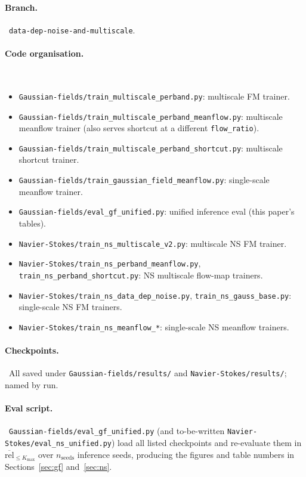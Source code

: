 \documentclass[11pt]{article}
\newcommand{\meanrel}{\overline{\text{rel}}}
\begin{document}
\paragraph{Branch.}\ \texttt{data-dep-noise-and-multiscale}.

\paragraph{Code organisation.}\
\begin{itemize}
\item \texttt{Gaussian-fields/train\_multiscale\_perband.py}: multiscale FM trainer.
\item \texttt{Gaussian-fields/train\_multiscale\_perband\_meanflow.py}: multiscale meanflow trainer (also serves shortcut at a different \texttt{flow\_ratio}).
\item \texttt{Gaussian-fields/train\_multiscale\_perband\_shortcut.py}: multiscale shortcut trainer.
\item \texttt{Gaussian-fields/train\_gaussian\_field\_meanflow.py}: single-scale meanflow trainer.
\item \texttt{Gaussian-fields/eval\_gf\_unified.py}: unified inference eval (this paper's tables).
\item \texttt{Navier-Stokes/train\_ns\_multiscale\_v2.py}: multiscale NS FM trainer.
\item \texttt{Navier-Stokes/train\_ns\_perband\_meanflow.py}, \texttt{train\_ns\_perband\_shortcut.py}: NS multiscale flow-map trainers.
\item \texttt{Navier-Stokes/train\_ns\_data\_dep\_noise.py}, \texttt{train\_ns\_gauss\_base.py}: single-scale NS FM trainers.
\item \texttt{Navier-Stokes/train\_ns\_meanflow\_*}: single-scale NS meanflow trainers.
\end{itemize}

\paragraph{Checkpoints.}\ All saved under \texttt{Gaussian-fields/results/} and \texttt{Navier-Stokes/results/}; named by run.

\paragraph{Eval script.}\ \texttt{Gaussian-fields/eval\_gf\_unified.py} (and to-be-written \texttt{Navier-Stokes/eval\_ns\_unified.py}) load all listed checkpoints and re-evaluate them in $\meanrel_{\le K_{\max}}$ over $n_{\text{seeds}}$ inference seeds, producing the figures and table numbers in Sections~\ref{sec:gf} and~\ref{sec:ns}.
\end{document}
